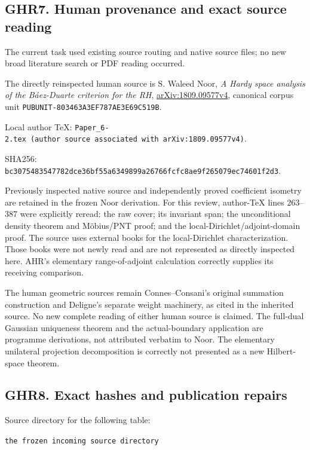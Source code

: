\documentclass[
]{article}
\begin{document}
\subsection{GHR7. Human provenance and exact source reading}\label{ghr7.-human-provenance-and-exact-source-reading}

The current task used existing source routing and native source files; no new broad literature search or PDF reading occurred.

The directly reinspected human source is S. Waleed Noor, \emph{A Hardy space analysis of the Báez-Duarte criterion for the RH}, \href{https://arxiv.org/abs/1809.09577v4}{arXiv:1809.09577v4}, canonical corpus unit \texttt{PUBUNIT-803463A3EF787AE3E69C519B}.

Local author TeX: \texttt{Paper\_6-2.tex\ (author\ source\ associated\ with\ arXiv:1809.09577v4)}.

SHA256: \texttt{bc3075483547782dce36bf55a6349899a26766fcfc8ae9f265079ec74601f2d3}.

Previously inspected native source and independently proved coefficient isometry are retained in the frozen Noor derivation. For this review, author-TeX lines 263--387 were explicitly reread: the raw cover; its invariant span; the unconditional density theorem and Möbius/PNT proof; and the local-Dirichlet/adjoint-domain proof. The source uses external books for the local-Dirichlet characterization. Those books were not newly read and are not represented as directly inspected here. AHR's elementary range-of-adjoint calculation correctly supplies its receiving comparison.

The human geometric sources remain Connes--Consani's original summation construction and Deligne's separate weight machinery, as cited in the inherited source. No new complete reading of either human source is claimed. The full-dual Gaussian uniqueness theorem and the actual-boundary application are programme derivations, not attributed verbatim to Noor. The elementary unilateral projection decomposition is correctly not presented as a new Hilbert-space theorem.

\subsection{GHR8. Exact hashes and publication repairs}\label{ghr8.-exact-hashes-and-publication-repairs}

Source directory for the following table:

\texttt{the\ frozen\ incoming\ source\ directory}
\end{document}
